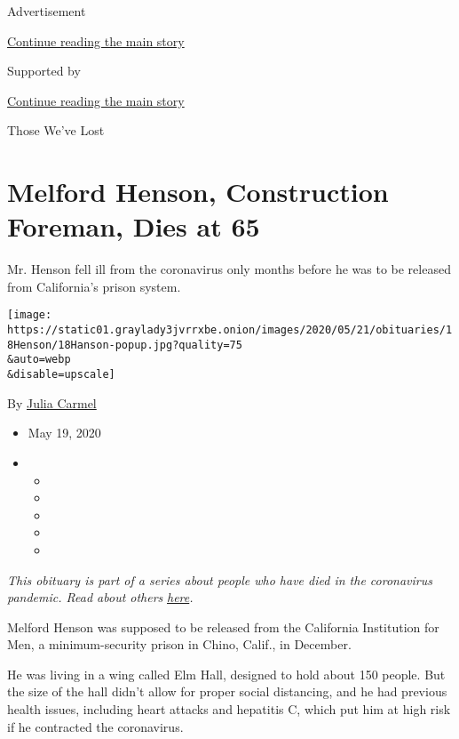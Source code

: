 Advertisement

\protect\hyperlink{after-top}{Continue reading the main story}

Supported by

\protect\hyperlink{after-sponsor}{Continue reading the main story}

Those We've Lost

\hypertarget{melford-henson-construction-foreman-dies-at-65}{%
\section{Melford Henson, Construction Foreman, Dies at
65}\label{melford-henson-construction-foreman-dies-at-65}}

Mr. Henson fell ill from the coronavirus only months before he was to be
released from California's prison system.

\texttt{[image: https://static01.graylady3jvrrxbe.onion/images/2020/05/21/obituaries/18Henson/18Hanson-popup.jpg?quality=75\\\&auto=webp\\\&disable=upscale]}

By \href{https://www.nytimes3xbfgragh.onion/by/julia-carmel}{Julia
Carmel}

\begin{itemize}
\item
  May 19, 2020
\item
  \begin{itemize}
  \item
  \item
  \item
  \item
  \item
  \end{itemize}
\end{itemize}

\emph{This obituary is part of a series about people who have died in
the coronavirus pandemic. Read about others}
\href{https://www.nytimes3xbfgragh.onion/series/people-who-have-died-of-the-coronavirus}{\emph{here}}\emph{.}

Melford Henson was supposed to be released from the California
Institution for Men, a minimum-security prison in Chino, Calif., in
December.

He was living in a wing called Elm Hall, designed to hold about 150
people. But the size of the hall didn't allow for proper social
distancing, and he had previous health issues, including heart attacks
and hepatitis C, which put him at high risk if he contracted the
coronavirus.

